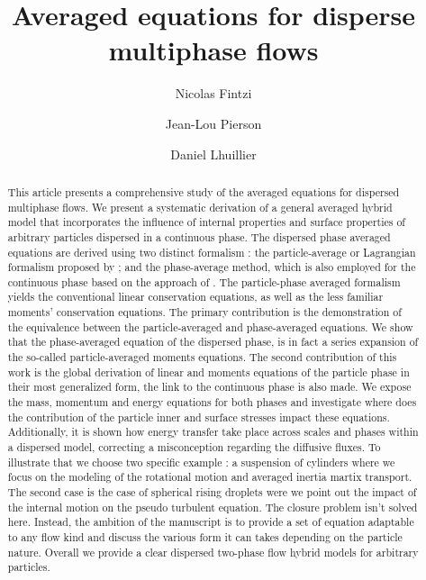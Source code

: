 \documentclass[11pt]{My_preprint}
\title{Averaged equations for disperse multiphase flows}
\author[1,2]{Nicolas Fintzi}
\author[1]{Jean-Lou Pierson}
\author[2]{Daniel Lhuillier}
\affil[1]{IFP Energies Nouvelles, Rond-point de l’changeur de Solaize, 69360 Solaize}
\affil[2]{Sorbonne Université, Institut Jean le Rond ∂’Alembert, 4 place Jussieu, 75252 PARIS CEDEX 05, France}
\begin{document}
\maketitle

\begin{abstract}
    This article presents a comprehensive study of the averaged equations for dispersed multiphase flows.
    We present a systematic derivation of a general averaged hybrid model that incorporates the influence of internal properties and surface properties of arbitrary particles dispersed in a continuous phase.
    The dispersed phase averaged equations are derived using two distinct formalism :
    the particle-average or Lagrangian formalism proposed by \citet{zhang1994ensemble,jackson1997locally};
    and the phase-average method, which is also employed for the continuous phase based on the approach of \citet{drew1983mathematical}. 
    The particle-phase averaged formalism yields the conventional linear conservation equations, as well as the less familiar moments' conservation equations.
    The primary contribution is the demonstration of the equivalence between the particle-averaged and phase-averaged equations. 
    We show that the phase-averaged equation of the dispersed phase, is in fact a series expansion of the so-called particle-averaged moments equations. 
    The second contribution of this work is the global derivation of linear and moments equations of the particle phase in their most generalized form, the link to the continuous phase is also made. 
    We expose the mass, momentum and energy equations for both phases and investigate where does the contribution of the particle inner and surface stresses impact these equations. 
    Additionally, it is shown how energy transfer take place across scales and phases within a dispersed model, correcting a misconception regarding the diffusive fluxes. 
    To illustrate that we choose two specific example : a suspension of cylinders where we focus on the modeling of the rotational motion and averaged inertia martix transport. 
    The second case is the case of spherical rising droplets were we point out the impact of the internal motion on the pseudo turbulent equation. 
    The closure problem isn't solved here. 
    Instead, the ambition of the manuscript is to provide a set of equation adaptable to any flow kind and discuss the various form it can takes depending on the particle nature. 
    Overall we provide a clear dispersed two-phase flow hybrid models for arbitrary particles. 
\end{abstract}
\end{document}

